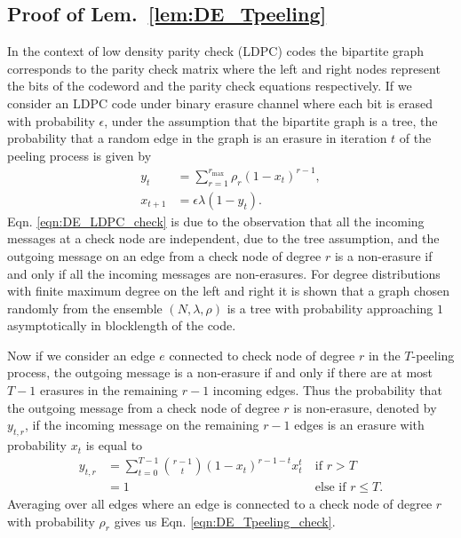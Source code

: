 \subsection{Proof of Lem.~\ref{lem:DE_Tpeeling}}
\label{appendix:proof_DE_Tpeeling}
In the context of low density parity check (LDPC) codes the bipartite graph corresponds to the parity check matrix where the left and right nodes represent the bits of the codeword and the parity check equations respectively. If we consider an LDPC code under binary erasure channel where each bit is erased with probability $\epsilon$, under the assumption that the bipartite graph is a tree, the probability that a random edge in the graph is an erasure in iteration $t$ of the peeling process is given by \cite{richardson2008modern}
\begin{align}
y_{t}&=\sum_{r=1}^{r_{\max}} \rho_r (1-x_t)^{r-1}, \label{eqn:DE_LDPC_check}\\
x_{t+1}&=\epsilon \lambda(1-y_t).\label{eqn:DE_LDPC_bit}
\end{align}
Eqn. \eqref{eqn:DE_LDPC_check} is due to the observation that all the incoming messages at a check node are independent, due to the tree assumption, and the outgoing message on an edge from a check node of degree $r$ is a non-erasure if and only if all the incoming messages are non-erasures. For degree distributions with finite maximum degree on the left and right it is shown that a graph chosen randomly from the ensemble $(N,\lambda,\rho)$ is a tree with probability approaching $1$ asymptotically in blocklength of the code.

Now if we consider an edge $e$ connected to check node of degree $r$ in the $T$-peeling process, the outgoing message is a non-erasure if and only if there are at most $T-1$ erasures in the remaining $r-1$ incoming edges. Thus the probability that the outgoing message from a check node of degree $r$ is non-erasure, denoted by $y_{t,r}$, if the incoming message on the remaining $r-1$ edges is an erasure with probability $x_t$ is equal to
\begin{align*}
y_{t,r}&=\sum_{t=0}^{T-1}\binom{r-1}{t}(1-x_t)^{r-1-t} x_t^{t}  ~&\text{if } r>T\\
&=1 ~&\text{else if } r\leq T.
\end{align*}
Averaging over all edges where an edge is connected to a check node of degree $r$ with probability $\rho_r$ gives us Eqn. \eqref{eqn:DE_Tpeeling_check}.

